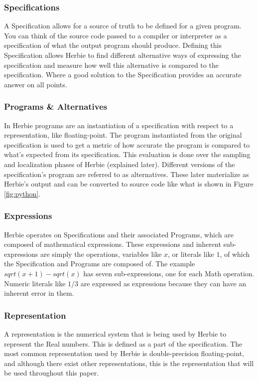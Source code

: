 \documentclass{article}
\begin{document}
\subsubsection{Specifications}
A Specification allows for a source of truth to be defined for a given program. You can think of the source code passed to a compiler or interpreter as a specification of what the output program should produce. Defining this Specification allows Herbie to find different alternative ways of expressing the specification and measure how well this alternative is compared to the specification. Where a good solution to the Specification provides an accurate answer on all points.

\subsubsection{Programs \& Alternatives}
In Herbie programs are an instantiation of a specification with respect to a representation, like floating-point. The program instantiated from the original specification is used to get a metric of how accurate the program is compared to what's expected from its specification. This evaluation is done over the sampling and localization phases of Herbie (explained later). Different versions of the specification’s program are referred to as alternatives. These later materialize as Herbie’s output and can be converted to source code like what is shown in Figure \ref{fig:python}.

\subsubsection{Expressions}
Herbie operates on Specifications and their associated Programs, which are composed of mathematical expressions. These expressions and inherent sub-expressions are simply the operations, variables like $x$, or literals like $1$, of which the Specification and Programs are composed of. The example \newline $sqrt(x + 1) - sqrt(x)$ has seven sub-expressions, one for each Math operation. Numeric literals like $1/3$ are expressed as expressions because they can have an inherent error in them.

\subsubsection{Representation}
A representation is the numerical system that is being used by Herbie to represent the Real numbers. This is defined as a part of the specification. The most common representation used by Herbie is double-precision floating-point, and although there exist other representations, this is the representation that will be used throughout this paper.
\end{document}
